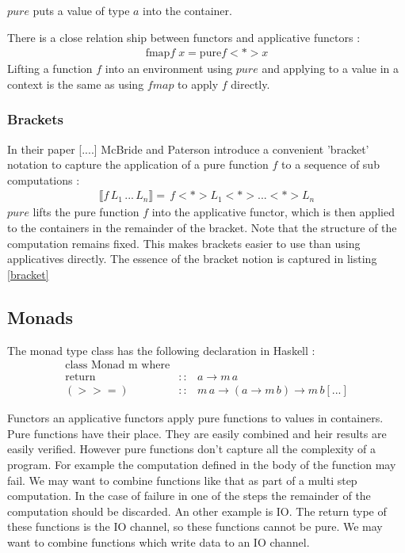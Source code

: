 \documentclass[12pt,fleqn]{article}
\begin{document}
$pure$ puts a value of type $a$ into the container.

There is a close relation ship between functors and applicative functors :
\begin{eqnarray*}
  \mbox{fmap} f \; x = \mbox{pure} f <*> x
\end{eqnarray*} 
Lifting a function $f$ into an environment using $pure$ and applying to a value in a context is the same as using $fmap$ to apply $f$ directly.

%
%
%
\subsubsection{Brackets}
%
%

In their paper [....] McBride and Paterson introduce a convenient 'bracket' notation to capture the application of a pure function $f$ 
to a sequence of sub computations :
\begin{eqnarray*}
 \llbracket f\, L_{1}\, ...\, L_{n} \rrbracket  =  \, f <*> L_{1} <*>...<*> L_{n}
\end{eqnarray*}
$pure$ lifts the pure function $f$ into the applicative functor, which is then applied to the containers in the remainder of the bracket. 
Note that the structure of the computation remains fixed.
This makes brackets easier to use than using applicatives directly.
The essence of the bracket notion is captured in listing \ref{bracket}

%
%
%
\subsection{Monads}
\label{subsec:monad}
%
%


The monad type class has the following declaration in Haskell :
\begin{eqnarray*}
\mbox{class Monad m where} \\
\mbox{return} &::& a \rightarrow m \, a \\
(>>=) &::& m \, a \rightarrow ( a \rightarrow m \, b) \rightarrow m \, b
[...] 
\end{eqnarray*}

Functors an applicative functors apply pure functions to values in containers.
Pure functions have their place. 
They are easily combined and heir results are easily verified.
However pure functions don't capture all the complexity of a program.
For example the computation defined in the body of the function may fail.
We may want to combine functions like that as part of a multi step computation. 
In the case of failure in one of the steps the remainder of the computation should be discarded.
An other example is IO.
The return type of these functions is the IO channel, so these functions cannot be pure.
We may want to combine functions which write data to an IO channel.
\end{document}
